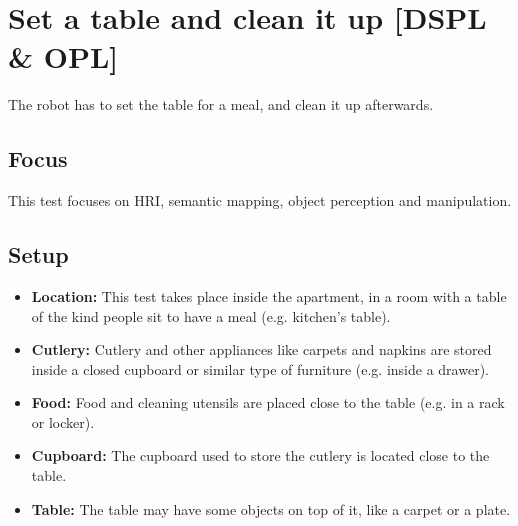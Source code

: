 \section{Set a table and clean it up [DSPL \& OPL]}
The robot has to set the table for a meal, and clean it up afterwards.

\subsection{Focus}
This test focuses on HRI, semantic mapping, object perception and manipulation.

\subsection{Setup}
\begin{itemize}
	\item \textbf{Location:} This test takes place inside the apartment, in a room with a table of the kind people sit to have a meal (e.g. kitchen's table).
	\item \textbf{Cutlery:} Cutlery and other appliances like carpets and napkins are stored inside a closed cupboard or similar type of furniture (e.g. inside a drawer).
	\item \textbf{Food:} Food and cleaning utensils are placed close to the table (e.g. in a rack or locker).
	\item \textbf{Cupboard:} The cupboard used to store the cutlery is located close to the table.
	\item \textbf{Table:} The table may have some objects on top of it, like a carpet or a plate.
\end{itemize}

